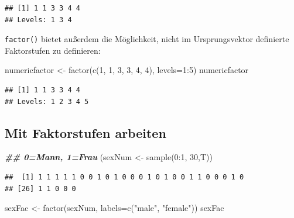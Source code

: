 \documentclass[
]{book}
\newenvironment{Shaded}{\begin{snugshade}}{\end{snugshade}}
\newcommand{\AttributeTok}[1]{\textcolor[rgb]{0.77,0.63,0.00}{#1}}
\newcommand{\DecValTok}[1]{\textcolor[rgb]{0.00,0.00,0.81}{#1}}
\newcommand{\DocumentationTok}[1]{\textcolor[rgb]{0.56,0.35,0.01}{\textbf{\textit{#1}}}}
\newcommand{\FunctionTok}[1]{\textcolor[rgb]{0.00,0.00,0.00}{#1}}
\newcommand{\NormalTok}[1]{#1}
\newcommand{\OtherTok}[1]{\textcolor[rgb]{0.56,0.35,0.01}{#1}}
\newcommand{\SpecialCharTok}[1]{\textcolor[rgb]{0.00,0.00,0.00}{#1}}
\newcommand{\StringTok}[1]{\textcolor[rgb]{0.31,0.60,0.02}{#1}}
\begin{document}
\begin{verbatim}
## [1] 1 1 3 3 4 4
## Levels: 1 3 4
\end{verbatim}

\texttt{factor()} bietet außerdem die Möglichkeit, nicht im Ursprungsvektor definierte Faktorstufen zu definieren:

\begin{Shaded}
\begin{Highlighting}[]
\NormalTok{numericfactor }\OtherTok{\textless{}{-}} \FunctionTok{factor}\NormalTok{(}\FunctionTok{c}\NormalTok{(}\DecValTok{1}\NormalTok{, }\DecValTok{1}\NormalTok{, }\DecValTok{3}\NormalTok{, }\DecValTok{3}\NormalTok{, }\DecValTok{4}\NormalTok{, }\DecValTok{4}\NormalTok{), }\AttributeTok{levels=}\DecValTok{1}\SpecialCharTok{:}\DecValTok{5}\NormalTok{)}
\NormalTok{numericfactor}
\end{Highlighting}
\end{Shaded}

\begin{verbatim}
## [1] 1 1 3 3 4 4
## Levels: 1 2 3 4 5
\end{verbatim}

\hypertarget{mit-faktorstufen-arbeiten}{%
\subsection{Mit Faktorstufen arbeiten}\label{mit-faktorstufen-arbeiten}}

\begin{Shaded}
\begin{Highlighting}[]
\DocumentationTok{\#\# 0=Mann, 1=Frau}
\NormalTok{(sexNum }\OtherTok{\textless{}{-}} \FunctionTok{sample}\NormalTok{(}\DecValTok{0}\SpecialCharTok{:}\DecValTok{1}\NormalTok{, }\DecValTok{30}\NormalTok{,T)) }
\end{Highlighting}
\end{Shaded}

\begin{verbatim}
##  [1] 1 1 1 1 1 0 0 1 0 1 0 0 0 1 0 1 0 0 1 1 0 0 0 1 0
## [26] 1 1 0 0 0
\end{verbatim}

\begin{Shaded}
\begin{Highlighting}[]
\NormalTok{sexFac }\OtherTok{\textless{}{-}} \FunctionTok{factor}\NormalTok{(sexNum, }\AttributeTok{labels=}\FunctionTok{c}\NormalTok{(}\StringTok{"male"}\NormalTok{, }\StringTok{"female"}\NormalTok{))}
\NormalTok{sexFac}
\end{Highlighting}
\end{Shaded}
\end{document}
